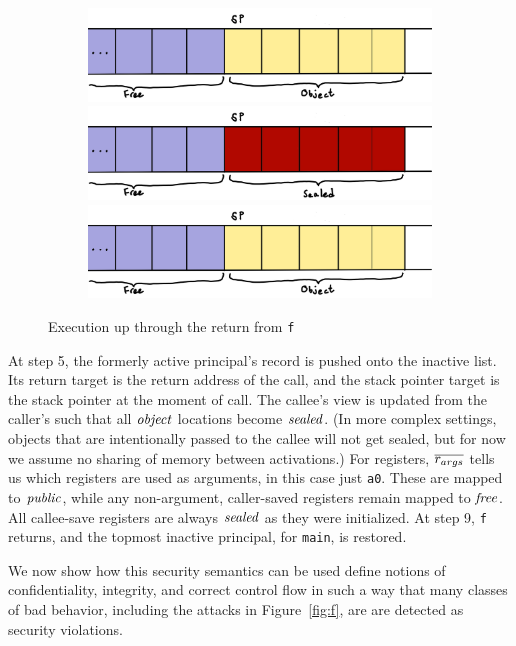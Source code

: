 \documentclass[10pt,conference]{ieeetran}%
\theoremstyle{definition}
\begin{document}
\begin{figure}
\begin{subfigure}[t]{.4\textwidth}
    \includegraphics[width=\columnwidth]{stack2.png}
    \includegraphics[width=\columnwidth]{stack3.png}
    \includegraphics[width=\columnwidth]{stack4.png}
  \end{subfigure}

\caption{Execution up through the return from {\tt f}}
\label{fig:exec1}
\end{figure}
%
At step 5, the formerly active principal's record is pushed onto the inactive list.
Its return target is the return address of the call, 
and the stack pointer target is the stack pointer at the moment of call.
The callee's view is updated from the caller's such that all \(\mathit{object}\) locations
become \(\mathit{sealed}\). (In more complex settings, objects that are intentionally passed
to the callee will not get sealed, but for now we assume no sharing of memory between activations.)
For registers, \(\overline{r_{args}}\) tells us which registers are used as arguments,
in this case just {\tt a0}. These are mapped to \(\mathit{public}\), while any non-argument, caller-saved
registers remain  mapped to \(\mathit{free}\). All callee-save registers are always \(\mathit{sealed}\)
as they were initialized.
At step 9, {\tt f} returns, and the topmost inactive principal, for {\tt main}, is restored.

We now show how this security semantics can be used define notions of confidentiality,
integrity, and correct control flow in such a way that many classes of
bad behavior, including the attacks in Figure~\ref{fig:f}, are 
are detected as security violations. 
\end{document}
